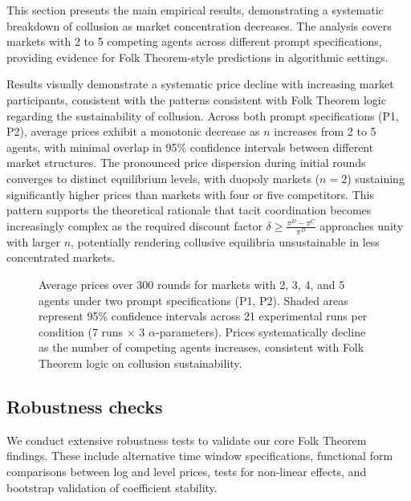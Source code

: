 This section presents the main empirical results, demonstrating a systematic breakdown of collusion as market concentration decreases. The analysis covers markets with 2 to 5 competing agents across different prompt specifications, providing evidence for Folk Theorem-style predictions in algorithmic settings.

Results visually demonstrate a systematic price decline with increasing market participants, consistent with the patterns consistent with Folk Theorem logic regarding the sustainability of collusion. Across both prompt specifications (P1, P2), average prices exhibit a monotonic decrease as $n$ increases from 2 to 5 agents, with minimal overlap in 95\% confidence intervals between different market structures. The pronounced price dispersion during initial rounds converges to distinct equilibrium levels, with duopoly markets ($n=2$) sustaining significantly higher prices than markets with four or five competitors. This pattern supports the theoretical rationale that tacit coordination becomes increasingly complex as the required discount factor $\delta \geq \frac{\pi^D - \pi^C}{\pi^D}$ approaches unity with larger $n$, potentially rendering collusive equilibria unsustainable in less concentrated markets.

\begin{figure}[H]
    \centering
    
    \caption{Average prices over 300 rounds for markets with 2, 3, 4, and 5 agents under two prompt specifications (P1, P2). Shaded areas represent 95\% confidence intervals across 21 experimental runs per condition (7 runs × 3 $\alpha$-parameters). Prices systematically decline as the number of competing agents increases, consistent with Folk Theorem logic on collusion sustainability.}
    \label{fig:ts_prices_comb}
\end{figure}


\subsection*{Robustness checks}\label{app:robust}

We conduct extensive robustness tests to validate our core Folk Theorem findings. These include alternative time window specifications, functional form comparisons between log and level prices, tests for non-linear effects, and bootstrap validation of coefficient stability.

